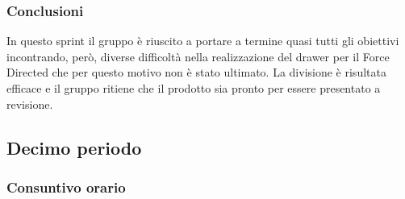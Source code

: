 \subsubsection{Conclusioni}
In questo sprint il gruppo è riuscito a portare a termine quasi tutti gli obiettivi incontrando, però, diverse difficoltà nella realizzazione del drawer per il Force Directed che per questo motivo non è stato ultimato. La divisione è risultata efficace e il gruppo ritiene che il prodotto sia pronto per essere presentato a revisione.


\subsection{Decimo periodo}
\subsubsection{Consuntivo orario}
